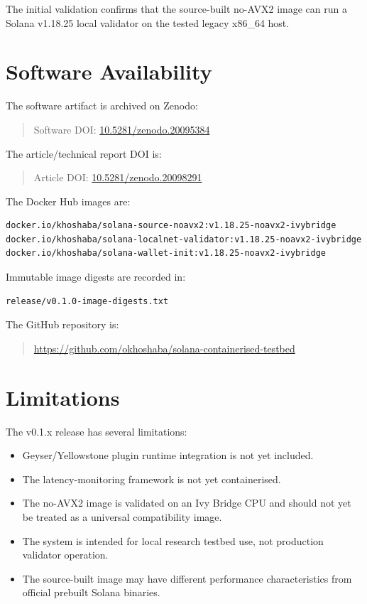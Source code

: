 \documentclass[11pt,a4paper]{article}
\begin{document}
The initial validation confirms that the source-built no-AVX2 image can run a Solana v1.18.25 local validator on the tested legacy x86\_64 host.

\section{Software Availability}

The software artifact is archived on Zenodo:

\begin{quote}
Software DOI: \href{https://doi.org/10.5281/zenodo.20095384}{10.5281/zenodo.20095384}
\end{quote}

The article/technical report DOI is:

\begin{quote}
Article DOI: \href{https://doi.org/10.5281/zenodo.20098291}{10.5281/zenodo.20098291}
\end{quote}

The Docker Hub images are:

\begin{lstlisting}
docker.io/khoshaba/solana-source-noavx2:v1.18.25-noavx2-ivybridge
docker.io/khoshaba/solana-localnet-validator:v1.18.25-noavx2-ivybridge
docker.io/khoshaba/solana-wallet-init:v1.18.25-noavx2-ivybridge
\end{lstlisting}

Immutable image digests are recorded in:

\begin{lstlisting}
release/v0.1.0-image-digests.txt
\end{lstlisting}

The GitHub repository is:

\begin{quote}
\url{https://github.com/okhoshaba/solana-containerised-testbed}
\end{quote}

\section{Limitations}

The v0.1.x release has several limitations:

\begin{itemize}[leftmargin=2em]
  \item Geyser/Yellowstone plugin runtime integration is not yet included.
  \item The latency-monitoring framework is not yet containerised.
  \item The no-AVX2 image is validated on an Ivy Bridge CPU and should not yet be treated as a universal compatibility image.
  \item The system is intended for local research testbed use, not production validator operation.
  \item The source-built image may have different performance characteristics from official prebuilt Solana binaries.
\end{itemize}
\end{document}
